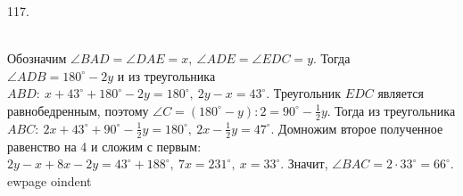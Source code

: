 117. \begin{figure}[ht!]
\end{figure}\\
Обозначим $\angle BAD=\angle DAE=x,\ \angle ADE=\angle EDC=y.$ Тогда $\angle ADB=180^\circ-2y$ и из треугольника $ABD:\ x+43^\circ+180^\circ-2y=180^\circ,\ 2y-x=43^\circ.$ Треугольник $EDC$ является равнобедренным, поэтому $\angle C=(180^\circ-y):2=90^\circ-\frac{1}{2}y.$ Тогда из треугольника $ABC:\ 2x+43^\circ+90^\circ-\frac{1}{2}y=180^\circ,\ 2x-\frac{1}{2}y=47^\circ.$ Домножим второе полученное равенство на 4 и сложим с первым: $2y-x+8x-2y=43^\circ+188^\circ,\ 7x=231^\circ,\ x=33^\circ.$ Значит, $\angle BAC=2\cdot33^\circ=66^\circ.$
ewpage
oindent
